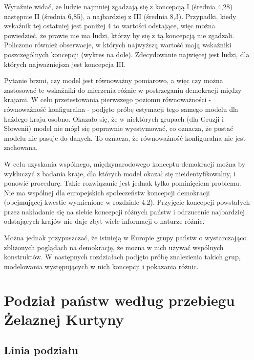 \documentclass[12pt]{article}
\begin{document}
Wyraźnie widać, że ludzie najmniej zgadzają się z koncepcją I (średnia 4,28) następnie II (średnia 6,85), a najbardziej z III (średnia 8,3). Przypadki, kiedy wskaźnik tej ostatniej jest poniżej 4 to wartości odstające, więc można powiedzieć, że prawie nie ma ludzi, którzy by się z tą koncepcją nie zgadzali. Policzono również obserwacje, w których najwyższą wartość mają wskaźniki poszczególnych koncepcji (wykres na dole). Zdecydowanie najwięcej jest ludzi, dla których najważniejsza jest koncepcja III.

Pytanie brzmi, czy model jest równoważny pomiarowo, a więc czy można zastosować te wskaźniki do mierzenia różnic w postrzeganiu demokracji między krajami. W celu przetestowania pierwszego poziomu równoważności - równoważność konfiguralna - podjęto próbę estymacji tego samego modelu dla każdego kraju osobno. Okazało się, że w niektórych grupach (dla Gruzji i Słowenii) model nie mógł się poprawnie wyestymować, co oznacza, że postać modelu nie pasuje do danych. To oznacza, że równoważność konfiguralna nie jest zachowana.

W celu uzyskania wspólnego, międzynarodowego konceptu demokracji można by wykluczyć z badania kraje, dla których model okazał się nieidentyfikowalny, i ponowić procedurę. Takie rozwiązanie jest jednak tylko pominięciem problemu. Nie ma wspólnej dla europejskich społeczeństw koncepcji demokracji (obejmującej kwestie wymienione w rozdziale 4.2). Przyjęcie koncepcji powstałych przez nakładanie się na siebie koncepcji różnych państw i odrzucenie najbardziej odstających krajów nie daje zbyt wiele informacji o naturze różnic.

Można jednak przypuszczać, że istnieją w Europie grupy państw o wystarczająco zbliżonych poglądach na demokrację, że można w nich używać wspólnych konstruktów. W następnych rozdziałach podjęto próbę znalezienia takich grup, modelowania występujących w nich koncepcji i pokazania różnic.

\hypertarget{podziaux142-paux144stw-wedux142ug-przebiegu-ux17celaznej-kurtyny}{%
\section{Podział państw według przebiegu Żelaznej Kurtyny}\label{podziaux142-paux144stw-wedux142ug-przebiegu-ux17celaznej-kurtyny}}

\hypertarget{linia-podziaux142u}{%
\subsection{Linia podziału}\label{linia-podziaux142u}}
\end{document}
